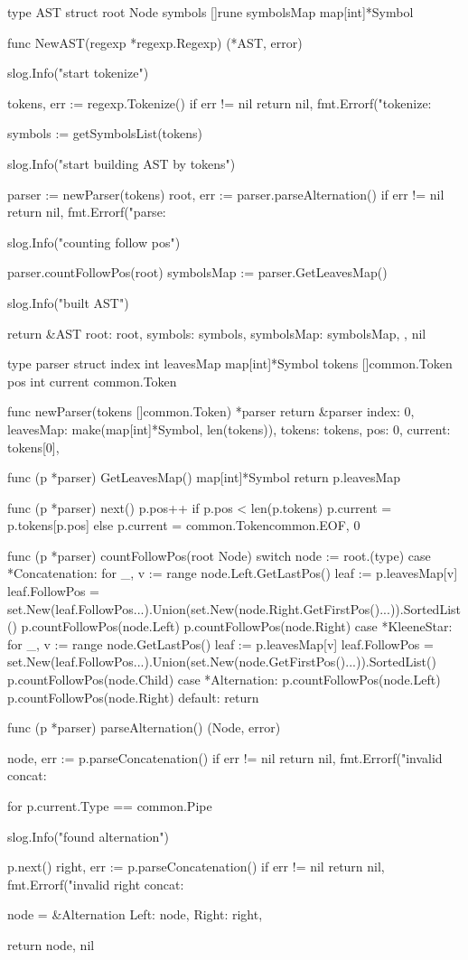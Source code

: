 type AST struct {
	root       Node
	symbols    []rune
	symbolsMap map[int]*Symbol
}

func NewAST(regexp *regexp.Regexp) (*AST, error) {
	slog.Info("start tokenize")

	tokens, err := regexp.Tokenize()
	if err != nil {
		return nil, fmt.Errorf("tokenize: %
	}

	symbols := getSymbolsList(tokens)

	slog.Info("start building AST by tokens")

	parser := newParser(tokens)
	root, err := parser.parseAlternation()
	if err != nil {
		return nil, fmt.Errorf("parse: %
	}

	slog.Info("counting follow pos")

	parser.countFollowPos(root)
	symbolsMap := parser.GetLeavesMap()

	slog.Info("built AST")

	return &AST{
		root:       root,
		symbols:    symbols,
		symbolsMap: symbolsMap,
	}, nil
}

type parser struct {
	index     int
	leavesMap map[int]*Symbol
	tokens    []common.Token
	pos       int
	current   common.Token
}

func newParser(tokens []common.Token) *parser {
	return &parser{
		index:     0,
		leavesMap: make(map[int]*Symbol, len(tokens)),
		tokens:    tokens,
		pos:       0,
		current:   tokens[0],
	}
}

func (p *parser) GetLeavesMap() map[int]*Symbol {
	return p.leavesMap
}

func (p *parser) next() {
	p.pos++
	if p.pos < len(p.tokens) {
		p.current = p.tokens[p.pos]
	} else {
		p.current = common.Token{common.EOF, 0}
	}
}

func (p *parser) countFollowPos(root Node) {
	switch node := root.(type) {
	case *Concatenation:
		for _, v := range node.Left.GetLastPos() {
			leaf := p.leavesMap[v]
			leaf.FollowPos = set.New(leaf.FollowPos...).Union(set.New(node.Right.GetFirstPos()...)).SortedList()
		}
		p.countFollowPos(node.Left)
		p.countFollowPos(node.Right)
	case *KleeneStar:
		for _, v := range node.GetLastPos() {
			leaf := p.leavesMap[v]
			leaf.FollowPos = set.New(leaf.FollowPos...).Union(set.New(node.GetFirstPos()...)).SortedList()
		}
		p.countFollowPos(node.Child)
	case *Alternation:
		p.countFollowPos(node.Left)
		p.countFollowPos(node.Right)
	default:
		return
	}
}

func (p *parser) parseAlternation() (Node, error) {
	node, err := p.parseConcatenation()
	if err != nil {
		return nil, fmt.Errorf("invalid concat: %
	}

	for p.current.Type == common.Pipe {
		slog.Info("found alternation")

		p.next()
		right, err := p.parseConcatenation()
		if err != nil {
			return nil, fmt.Errorf("invalid right concat: %
		}

		node = &Alternation{
			Left:  node,
			Right: right,
		}
	}

	return node, nil
}

